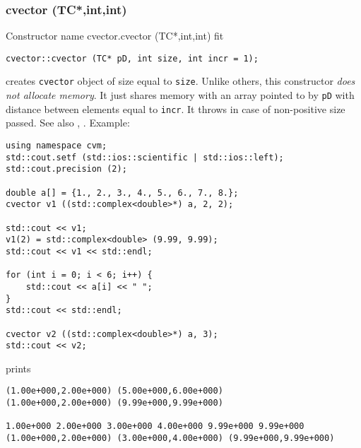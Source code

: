 \subsubsection{cvector (TC*,int,int)}
Constructor%
\pdfdest name {cvector.cvector (TC*,int,int)} fit
\begin{verbatim}
cvector::cvector (TC* pD, int size, int incr = 1);
\end{verbatim}
creates  \verb"cvector" object of size equal to \verb"size".
Unlike others, this constructor \textit{does not allocate memory}.
It just shares memory with an array pointed to by \verb"pD" with
 distance between elements equal to \verb"incr".
It throws  
in case of non-positive size passed.
See also , .
Example:
\begin{Verbatim}
using namespace cvm;
std::cout.setf (std::ios::scientific | std::ios::left);
std::cout.precision (2);

double a[] = {1., 2., 3., 4., 5., 6., 7., 8.};
cvector v1 ((std::complex<double>*) a, 2, 2);

std::cout << v1;
v1(2) = std::complex<double> (9.99, 9.99);
std::cout << v1 << std::endl;

for (int i = 0; i < 6; i++) {
    std::cout << a[i] << " ";
}
std::cout << std::endl;

cvector v2 ((std::complex<double>*) a, 3);
std::cout << v2;
\end{Verbatim}
prints
\begin{Verbatim}
(1.00e+000,2.00e+000) (5.00e+000,6.00e+000)
(1.00e+000,2.00e+000) (9.99e+000,9.99e+000)

1.00e+000 2.00e+000 3.00e+000 4.00e+000 9.99e+000 9.99e+000
(1.00e+000,2.00e+000) (3.00e+000,4.00e+000) (9.99e+000,9.99e+000)
\end{Verbatim}
\newpage



